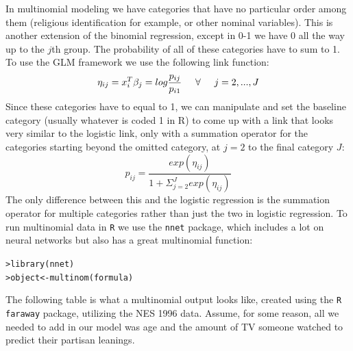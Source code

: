 \documentclass[12pt]{article}\usepackage[]{graphicx}\usepackage[]{color}
\makeatletter
\newcommand{\hlstd}[1]{\textcolor[rgb]{0.882,0.878,0.898}{#1}}%
\newcommand{\hlkwb}[1]{\textcolor[rgb]{0.902,0.675,0.196}{#1}}%
\newcommand{\hlkwd}[1]{\textcolor[rgb]{0.733,0.388,0.812}{#1}}%
\newenvironment{kframe}{%
 \def\at@end@of@kframe{}%
 \ifinner\ifhmode%
  \def\at@end@of@kframe{\end{minipage}}%
  \begin{minipage}{\columnwidth}%
 \fi\fi%
 \def\FrameCommand##1{\hskip\@totalleftmargin \hskip-\fboxsep
 \colorbox{shadecolor}{##1}\hskip-\fboxsep
     \hskip-\linewidth \hskip-\@totalleftmargin \hskip\columnwidth}%
 \MakeFramed {\advance\hsize-\width
   \@totalleftmargin\z@ \linewidth\hsize
   \@setminipage}}%
 {\par\unskip\endMakeFramed%
 \at@end@of@kframe}
\newenvironment{knitrout}{}{} %
\makeatother
\begin{document}
\begin{flushleft}
In multinomial modeling we have categories that have no particular order among them (religious identification for example, or other nominal variables). This is another extension of the binomial regression, except in 0-1 we have 0 all the way up to the $j$th group. The probability of all of these categories have to sum to 1. To use the GLM framework we use the following link function:\\
\begin{equation}
\eta_{ij} = x^{T}_i \beta_j = log \frac{p_{ij}}{p_{i1}} \hspace{.5cm} \forall  \hspace{.5cm}  j = 2, ... , J
\end{equation}
Since these categories have to equal to 1, we can manipulate and set the baseline category (usually whatever is coded 1 in R) to come up with a link that looks very similar to the logistic link, only with a summation operator for the categories starting beyond the omitted category, at $j=2$ to the final category $J$:\\
\begin{equation}
 p_{ij} = \frac{exp(\eta_{ij})}{1+ \Sigma^{J}_{j=2} exp (\eta_{ij})   }
\end{equation}
The only difference between this and the logistic regression is the summation operator for multiple categories rather than just the two in logistic regression. To run multinomial data in \texttt{R} we use the \texttt{nnet} package, which includes a lot on neural networks but also has a great multinomial function:\\


\begin{knitrout}
\color{fgcolor}\begin{kframe}
\begin{alltt}
\hlstd{> }\hlkwd{library}\hlstd{(nnet)}
\hlstd{> }\hlstd{object} \hlkwb{<-} \hlkwd{multinom}\hlstd{(formula)}
\end{alltt}
\end{kframe}
\end{knitrout}


The following table is what a multinomial output looks like, created using the \texttt{R faraway} package, utilizing the NES 1996 data. Assume, for some reason, all we needed to add in our model was age and the amount of TV someone watched to predict their partisan leanings. \\




\end{flushleft}
\end{document}

